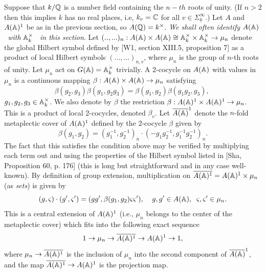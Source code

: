 Suppose that $k/{\Bbb{Q}}$ is a number field containing the $n-th$ roots of
unity. (If $n>2$ then this implies $k$ has no real places, i.e, $k_v=\Bbb{C}$
for all $v\in \Sigma _k^\infty $.)
Let $A$ and $A({\Bbb{A}})^1$ be as in the previous section,
so $A({\Bbb{Q}})=k^\times$.
\emph{We shall often identify }
$A({\Bbb{A}})$
\emph{\ with }
${\Bbb{A}}_k^{\times }$
\emph{\ in this section}. Let
$(..,...)_n:A({\Bbb{A}})\times A({\Bbb{A}})
\cong {\Bbb{A}}_k^{\times }\times {\Bbb{A}}_k^{\times}\rightarrow \mu _n$
denote the global Hilbert symbol defined by
[W1, section XIII.5, proposition 7] as a product of local
Hilbert symbols $(...,...)_{n,v}$, where
$\mu _n$ is the group of $n$-th roots of unity. Let $\mu _n$ act on 
$G({\Bbb{A}})={\Bbb{A}}_k^{\times }$ trivially.
A 2-cocycle on $A({\Bbb{A}})$ with
values in $\mu _n$ is a continuous mapping
$\beta :A({\Bbb{A}})\times A({\Bbb{A}})\rightarrow \mu _n$ satisfying 
\begin{equation}
\beta (g_2,g_3)\beta (g_1,g_2g_3)=\beta (g_1,g_2)\beta (g_1g_2,g_3),\;
\end{equation}
$g_1,g_2,g_3\in {\Bbb{A}}_k^{\times }$. We also denote by $\beta $ the
restriction
$\beta :A({\Bbb{A}})^1\times A({\Bbb{A}})^1\rightarrow \mu _n$. This
is a product of local 2-cocycles, denoted $\beta _v$. Let
$\overline{A(\Bbb{A})}^1$ denote the $n$-fold
metaplectic cover of $A({\Bbb{A}})^1$
defined by the 2-cocycle $\beta $ given by 
\begin{equation}
\beta (g_1,g_2)=(g_1^{-1},g_2^{-1})_n\cdot (-g_1g_2^{-1},g_1^{-1}g_2^{-1})_n.
\end{equation}
The fact that this satisfies the condition above may be verified by
multiplying each term out and using the properties of the Hilbert symbol
listed in [Sha, Proposition 60, p. 176] (this is long but
straightforward and in any case well-known).
By definition of group extension, multiplication
on $\overline{A({\Bbb{A}})^1}=A({\Bbb{A}})^1\times \mu _n$
(as \emph{sets}) is given by 
\begin{equation}
(g,\varsigma )\cdot (g^{\prime },\varsigma ^{\prime })=(gg^{\prime },\beta
(g_1,g_2)\varsigma \varsigma ^{\prime }),
\;\;\;\;g,g^{\prime }\in A({\Bbb{A}}),
\;\;\varsigma ,\varsigma ^{\prime }\in \mu _n.
\end{equation}
This is a central extension of $A({\Bbb{A}})^1$ (i.e.,
$\mu _n$ belongs to the
center of the metaplectic cover) which fits into the following exact
sequence 
\[
1\rightarrow \mu _n\rightarrow \overline{A({\Bbb{A}})^1}
\rightarrow A({\Bbb{A}})^1\rightarrow 1,
\]
where $\mu _n\rightarrow \overline{A({\Bbb{A}})^1}$ is the
inclusion of $\mu _n$ into the second component of
$\overline{A({\Bbb{A}})}^1$, and the map
$\overline{A({\Bbb{A}})^1}\rightarrow A({\Bbb{A}})^1$ is the
projection map.

